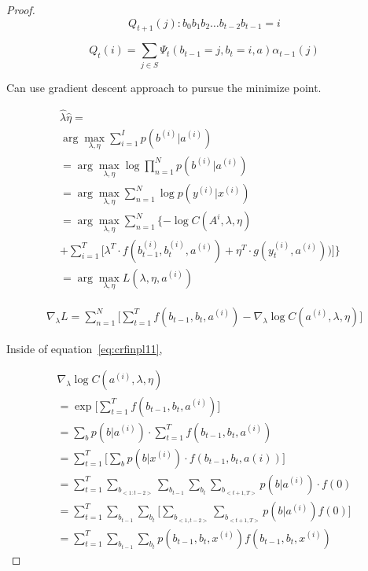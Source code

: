 \documentclass[journal,transmag]{IEEEtran}
\begin{document}
\begin{proof}
\begin{equation}\label{eq:crfinpl8}
       Q_{t+1}(j) : b_0 b_1 b_2 \dots b_{t-2} b_{t-1} = i
\end{equation}

\begin{equation}\label{eq:crfinpl9}
       Q_t(i) = \sum_{j\in S} \Psi_t (b_{t-1} = j , b_t = i, a ) \alpha_{t-1} (j)
\end{equation}

Can use gradient descent approach to pursue the minimize point.

\begin{equation}\label{eq:crfinpl10}
\begin{array}{ll}
    \hat{\lambda} \hat{\eta} =\\
    \arg \max_{\lambda,\eta}  \sum^I_{i=1} p(b^{(i)} | a^{(i)}) & \\ 
    = \arg \max_{\lambda,\eta} \log \prod^N_{n=1} p(b^(i)|a^(i)) & \\
    = \arg \max_{\lambda,\eta} \sum^N_{n=1} \log p(y^{(i)}|x^(i)) & \\
    = \arg \max_{\lambda,\eta} \sum^N_{n=1} \{ - \log C(A^{i},\lambda,\eta) & \\
    + \sum^T_{i=1} \lbrack \lambda^T \cdot f(b^{(i)}_{t-1}, b^{(i)}_t,a^{(i)})+  \eta^T \cdot g(y^{(i)}_t,a^{(i)}) ) \rbrack \} \\
    = \arg \max_{\lambda,\eta} L(\lambda,\eta,a^{(i)})
\end{array}
\end{equation}

\begin{equation}\label{eq:crfinpl11}
\begin{array}{ll}
    \nabla_{\lambda} L = \sum^N_{n=1}\lbrack \sum^T_{t=1} f(b_{t-1},b_{t},a^{(i)})- \nabla_{\lambda} \log C (a^{(i)},\lambda,\eta) \rbrack
\end{array}
\end{equation}

Inside of equation~\ref{eq:crfinpl11},

\begin{equation}\label{eq:crfinpl12}
\begin{array}{ll}
   \nabla_{\lambda} \log C (a^{(i)},\lambda,\eta) \\
   = \exp\lbrack \sum^T_{t=1}  f(b_{t-1},b_{t},a^{(i)}) \rbrack \\
   = \sum_{b} p(b|a^(i)) \cdot \sum^T_{t=1} f(b_{t-1},b_{t},a^(i))\\
   = \sum^T_{t=1} \lbrack \sum_{b} p(b|x^{(i)})\cdot f(b_{t-1},b_t,a(i)) \rbrack \\
   =\sum^T_{t=1} \sum_{b_{<1:t-2>}} \sum_{b_{t-1}} \sum_{b_t} \sum_{b_{<t+1,T>}} p(b|a^{(i)}) \cdot f(0) \\
   =\sum^T_{t=1} \sum_{b_{t-1}} \sum_{b_t} \lbrack \sum_{b_{<1,t-2>}} \sum_{b_{<t+1,T>}} p(b|a^(i)) f(0)  \rbrack \\
   = \sum^T_{t=1} \sum_{b_{t-1}} \sum_{b_t} p(b_{t-1},b_t,x^{(i)}) f(b_{t-1},b_{t},x^(i))
\end{array}
\end{equation}


\end{proof}
\end{document}
